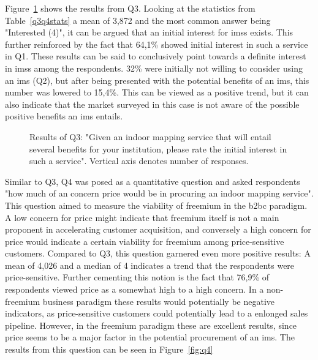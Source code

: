Figure~\ref{fig:q3} shows the results from Q3. Looking at the statistics from Table~\ref{q3q4stats} a mean of 3,872 and the most common answer being "Interested (4)", it can be argued that an initial interest for \glspl{ims} exists. This further reinforced by the fact that 64,1\% showed initial interest in such a service in Q1. These results can be said to conclusively point towards a definite interest in \glspl{ims} among the respondents. 32\% were initially not willing to consider using an \gls{ims} (Q2), but after being presented with the potential benefits of an \gls{ims}, this number was lowered to 15,4\%. This can be viewed as a positive trend, but it can also indicate that the market surveyed in this case is not aware of the possible positive benefits an \gls{ims} entails.


\begin{figure}
    \centering
    \caption{Results of Q3: "Given an indoor mapping service that will entail several benefits for your institution, please rate the initial interest in such a service". Vertical axis denotes number of responses.}
    \label{fig:q3}
\end{figure}



Similar to Q3, Q4 was posed as a quantitative question and asked respondents "how much of an concern price would be in procuring an indoor mapping service". This question aimed to measure the viability of freemium in the \gls{b2bc} paradigm. A low concern for price might indicate that freemium itself is not a main proponent in accelerating customer acquisition, and conversely a high concern for price would indicate a certain viability for freemium among price-sensitive customers. Compared to Q3, this question garnered even more positive results: A mean of 4,026 and a median of 4 indicates a trend that the respondents were price-sensitive. Further cementing this notion is the fact that 76,9\% of respondents viewed price as a somewhat high to a high concern. In a non-freemium business paradigm these results would potentially be negative indicators, as price-sensitive customers could potentially lead to a enlonged sales pipeline. However, in the freemium paradigm these are excellent results, since price seems to be a major factor in the potential procurement of an \gls{ims}. The results from this question can be seen in Figure~\ref{fig:q4}



